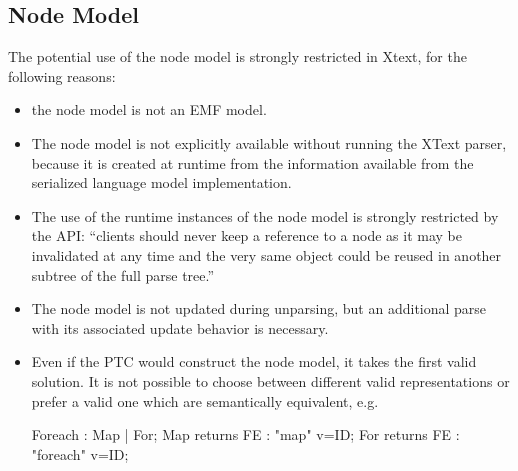 \subsection{Node Model}
The potential use of the node model is strongly restricted in Xtext, for the following reasons:
\begin{itemize}
	\item the node model is not an EMF model. 
	\item The node model is not explicitly available without running the XText parser, because it is created at runtime from the information available from the serialized language model implementation. 
	\item The use of the runtime instances of the node model is strongly restricted by the API: ``clients should never keep a reference to a node as it may be invalidated at any time and the very same object could be reused in another subtree of the full parse tree.''\cite{XTextAPI}
	\item The node model is not updated during unparsing, but an additional parse with its associated update behavior is necessary.
	\item Even if the PTC would construct the node model, it takes the first valid solution. It is not possible to choose between different valid representations or prefer a valid one which are semantically equivalent, e.g.\begin{xtxt}
Foreach 		: 	Map | For;
Map returns FE  	:  	"map" 		v=ID;
For returns FE  	: 	"foreach"	v=ID;
\end{xtxt}
\end{itemize}